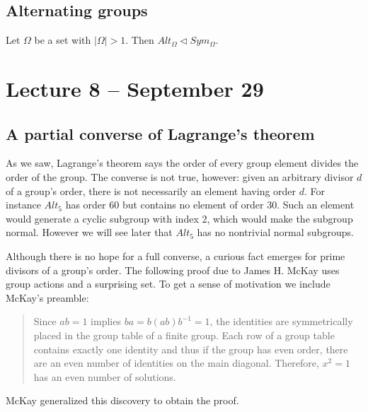 \documentclass[letterpaper]{article}
\begin{document}
\subsection{Alternating groups}

Let $\Omega$ be a set with $|\Omega|>1$. Then $Alt_\Omega \lhd
Sym_\Omega$.

\section{Lecture 8 -- September 29}

\subsection{A partial converse of Lagrange's theorem}

As we saw, Lagrange's theorem says the order of every group element
divides the order of the group. The converse is not true, however:
given an arbitrary divisor $d$ of a group's order, there is not
necessarily an element having order $d$. For instance $Alt_5$ has
order 60 but contains no element of order 30. Such an element would
generate a cyclic subgroup with index 2, which would make the
subgroup normal. However we will see later that $Alt_5$ has no
nontrivial normal subgroups.

Although there is no hope for a full converse, a curious fact emerges
for prime divisors of a group's order. The following proof due to
James H. McKay \cite{McKay59} uses group actions and a surprising
set. To get a sense of motivation we include McKay's preamble:
\begin{quote}
Since $ab=1$ implies $ba=b(ab)b^{-1}=1$, the identities are
symmetrically placed in the group table of a finite group. Each row
of a group table contains exactly one identity and thus if the group
has even order, there are an even number of identities on the main
diagonal. Therefore, $x^2=1$ has an even number of solutions.
\end{quote}

McKay generalized this discovery to obtain the proof.
\end{document}
